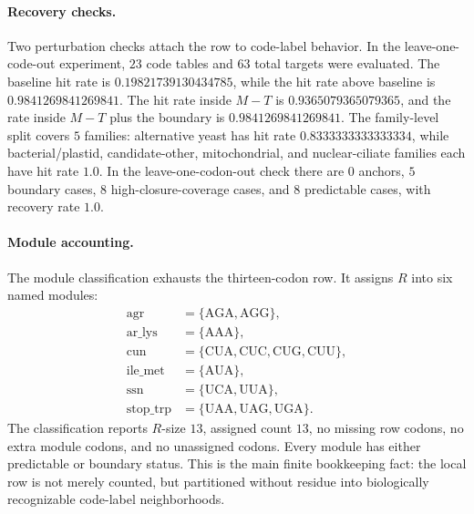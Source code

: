 \paragraph{Recovery checks.}
Two perturbation checks attach the row to code-label behavior.  In the leave-one-code-out experiment, $23$ code tables and $63$ total targets were evaluated.  The baseline hit rate is $0.19821739130434785$, while the hit rate above baseline is $0.9841269841269841$.  The hit rate inside $M-T$ is $0.9365079365079365$, and the rate inside $M-T$ plus the boundary is $0.9841269841269841$.  The family-level split covers $5$ families: alternative yeast has hit rate $0.8333333333333334$, while bacterial/plastid, candidate-other, mitochondrial, and nuclear-ciliate families each have hit rate $1.0$.  In the leave-one-codon-out check there are $0$ anchors, $5$ boundary cases, $8$ high-closure-coverage cases, and $8$ predictable cases, with recovery rate $1.0$.

\paragraph{Module accounting.}
The module classification exhausts the thirteen-codon row.  It assigns $R$ into six named modules:
$$
\begin{aligned}
\mathrm{agr}&=\{\mathrm{AGA},\mathrm{AGG}\},\\
\mathrm{ar\_lys}&=\{\mathrm{AAA}\},\\
\mathrm{cun}&=\{\mathrm{CUA},\mathrm{CUC},\mathrm{CUG},\mathrm{CUU}\},\\
\mathrm{ile\_met}&=\{\mathrm{AUA}\},\\
\mathrm{ssn}&=\{\mathrm{UCA},\mathrm{UUA}\},\\
\mathrm{stop\_trp}&=\{\mathrm{UAA},\mathrm{UAG},\mathrm{UGA}\}.
\end{aligned}
$$
The classification reports $R$-size $13$, assigned count $13$, no missing row codons, no extra module codons, and no unassigned codons.  Every module has either predictable or boundary status.  This is the main finite bookkeeping fact: the local row is not merely counted, but partitioned without residue into biologically recognizable code-label neighborhoods.

